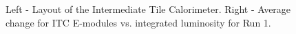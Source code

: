 \begin{figure}[htb]
\centering
{}
\quad
{}

\caption{Left - Layout of the Intermediate Tile Calorimeter. Right - Average change for ITC E-modules vs. integrated luminosity for Run 1.}
\end{figure} 

